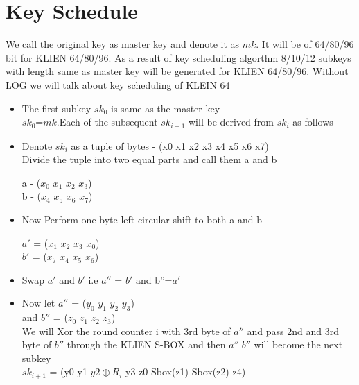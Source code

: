 \documentclass[preprint]{transcrypto}
\begin{document}
\section{Key Schedule}
We call the original key as master key and denote it as $mk$. It will be of 64/80/96 bit for  KLIEN 64/80/96. As a result of key scheduling algorthm 8/10/12  subkeys with length same as master key will be generated for KLIEN 64/80/96. Without LOG we will talk about key scheduling of KLEIN 64 \\

\begin{itemize}

\item The first subkey $sk_{0}$ is same as the master key \\
	$sk_{0}$=$mk$.Each of the subsequent $sk_{i+1}$ will be derived from $sk_{i}$ as follows - \\

\item Denote $sk_{i}$ as a tuple of bytes - (x0 x1 x2 x3 x4 x5 x6 x7) \\
Divide the tuple into two equal parts and call them a and b 

a - ($ x_{0}$ $x_{1}$ $x_{2}$ $x_{3}$) \\
b - ($x_{4}$ $x_{5}$ $x_{6}$ $x_{7}$) \\

\item Now Perform one byte left circular shift to both a and b

$a'$ = ($x_{1}$ $x_{2}$ $x_{3}$ $x_{0}$) \\
$b'$  = ($x_{7}$ $x_{4}$ $x_{5}$ $x_{6}$) \\

\item Swap $a'$ and $b'$  i.e $a''$ = $b'$  and b''=$a'$ \\

\item Now let $a''$ = ($y_{0}$ $y_{1}$ $y_{2}$ $y_{3}$) \\
and $b''$ = ($z_{0}$ $z_{1}$ $z_{2}$ $z_{3}$) \\

We will Xor the round counter i with 3rd byte of $a''$ and pass 2nd and 3rd byte of $b''$ through the KLIEN S-BOX and then $a''$|$b''$ will become the next subkey \\
$sk_{i+1}$ = (y0 y1 $ y2 \oplus R_i $ y3 z0 Sbox(z1) Sbox(z2) z4)\\
\end{itemize}
\end{document}
